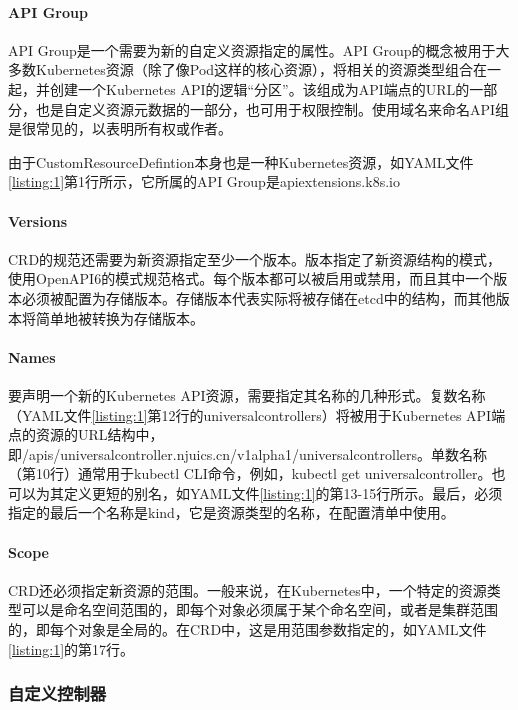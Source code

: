 \documentclass[macfonts,master]{njuthesis}
\begin{document}
\paragraph{API Group}

API Group是一个需要为新的自定义资源指定的属性。API Group的概念被用于大多数Kubernetes资源（除了像Pod这样的核心资源），将相关的资源类型组合在一起，并创建一个Kubernetes API的逻辑``分区''。该组成为API端点的URL的一部分，也是自定义资源元数据的一部分，也可用于权限控制。使用域名来命名API组是很常见的，以表明所有权或作者。

由于CustomResourceDefintion本身也是一种Kubernetes资源，如YAML文件\ref{listing:1}第1行所示，它所属的API Group是apiextensions.k8s.io

\paragraph{Versions}

CRD的规范还需要为新资源指定至少一个版本。版本指定了新资源结构的模式，使用OpenAPI6的模式规范格式。每个版本都可以被启用或禁用，而且其中一个版本必须被配置为存储版本。存储版本代表实际将被存储在etcd中的结构，而其他版本将简单地被转换为存储版本。

\paragraph{Names}

要声明一个新的Kubernetes API资源，需要指定其名称的几种形式。复数名称（YAML文件\ref{listing:1}第12行的universalcontrollers）将被用于Kubernetes API端点的资源的URL结构中，即/apis/universalcontroller.njuics.cn/v1alpha1/universalcontrollers。单数名称（第10行）通常用于kubectl CLI命令，例如，kubectl get universalcontroller。也可以为其定义更短的别名，如YAML文件\ref{listing:1}的第13-15行所示。最后，必须指定的最后一个名称是kind，它是资源类型的名称，在配置清单中使用。

\paragraph{Scope}

CRD还必须指定新资源的范围。一般来说，在Kubernetes中，一个特定的资源类型可以是命名空间范围的，即每个对象必须属于某个命名空间，或者是集群范围的，即每个对象是全局的。在CRD中，这是用范围参数指定的，如YAML文件\ref{listing:1}的第17行。

\subsubsection{自定义控制器}
\end{document}
